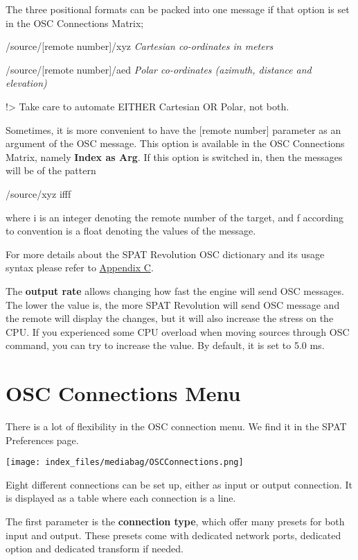 \documentclass[
  letterpaper,
  DIV=11,
  numbers=noendperiod]{scrreport}
\begin{document}
The three positional formats can be packed into one message if that
option is set in the OSC Connections Matrix;

/source/{[}remote number{]}/xyz \emph{Cartesian co-ordinates in meters}

/source/{[}remote number{]}/aed \emph{Polar co-ordinates (azimuth,
distance and elevation)}

!\textgreater{} Take care to automate EITHER Cartesian OR Polar, not
both.

Sometimes, it is more convenient to have the {[}remote number{]}
parameter as an argument of the OSC message. This option is available in
the OSC Connections Matrix, namely \textbf{Index as Arg}. If this option
is switched in, then the messages will be of the pattern

/source/xyz ifff

where i is an integer denoting the remote number of the target, and f
according to convention is a float denoting the values of the message.

For more details about the SPAT Revolution OSC dictionary and its usage
syntax please refer to \href{Appendix_C_OSC_Table.md}{Appendix C}.

The \textbf{output rate} allows changing how fast the engine will send
OSC messages. The lower the value is, the more SPAT Revolution will send
OSC message and the remote will display the changes, but it will also
increase the stress on the CPU. If you experienced some CPU overload
when moving sources through OSC command, you can try to increase the
value. By default, it is set to 5.0 ms.

\hypertarget{osc-connections-menu}{%
\section{OSC Connections Menu}\label{osc-connections-menu}}

There is a lot of flexibility in the OSC connection menu. We find it in
the SPAT Preferences page.

\texttt{[image: index\_files/mediabag/OSCConnections.png]}

Eight different connections can be set up, either as input or output
connection. It is displayed as a table where each connection is a line.

The first parameter is the \textbf{connection type}, which offer many
presets for both input and output. These presets come with dedicated
network ports, dedicated option and dedicated transform if needed.
\end{document}
